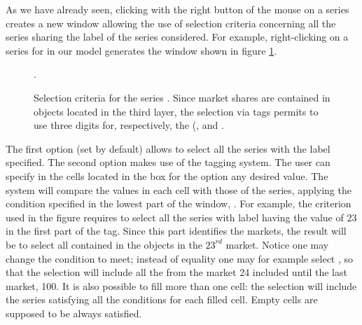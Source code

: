 \documentclass [11pt,a4paper] {book}
\begin{document}
As we have already seen, clicking with the right button of the mouse on a series creates a new window allowing the use of selection criteria concerning all the series sharing the label of the series considered. For example, right-clicking on a series for  in our model generates the window shown in figure \ref{fig:selectionb}.


\begin{figure}[ht]
  \centering
  \caption{\small Selection criteria for the series . Since market shares are contained in objects located in the third layer, the selection via tags permits to use three digits for, respectively, the (,  and . }.
   \label{fig:selectionb}
\end{figure}

The first option (set by default) allows to select all the series with the label specified. The second option makes use of the tagging system. The user can specify in the cells located in the box for the option  any desired value. The system will compare the values in each cell with those of the series, applying the condition specified in the lowest part of the window, . For example, the criterion used in the figure requires to select all the series with label  having the value of 23 in the first part of the tag. Since this part identifies the markets, the result will be to select all  contained in the objects  in the $23^{rd}$ market. Notice one may change the condition to meet; instead of equality one may for example select , so that the selection will include all the  from the market 24 included until the last market, 100. It is also possible to fill more than one cell: the selection will include the series satisfying all the conditions for each filled cell. Empty cells are supposed to be always satisfied.
\end{document}
